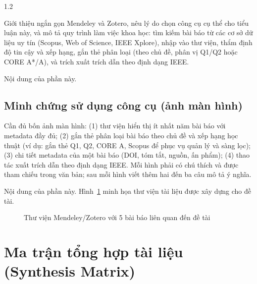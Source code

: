 \begin{spacing}{1.2}
\begin{huongdan}
Giới thiệu ngắn gọn Mendeley và Zotero, nêu lý do chọn công cụ cụ thể cho tiểu luận này, và mô tả quy trình làm việc khoa học: tìm kiếm bài báo từ các cơ sở dữ liệu uy tín (Scopus, Web of Science, IEEE Xplore), nhập vào thư viện, thẩm định độ tin cậy và xếp hạng, gắn thẻ phân loại (theo chủ đề, phân vị Q1/Q2 hoặc CORE A*/A), và trích xuất trích dẫn theo định dạng IEEE.
\end{huongdan}

Nội dung của phần này.

\subsection{Minh chứng sử dụng công cụ (ảnh màn hình)}
\label{subsec:minh_chung_cong_cu}

\begin{huongdan}
Cần đủ bốn ảnh màn hình: (1) thư viện hiển thị ít nhất năm bài báo với metadata đầy đủ; (2) gắn thẻ phân loại bài báo theo chủ đề và xếp hạng học thuật (ví dụ: gắn thẻ Q1, Q2, CORE A, Scopus để phục vụ quản lý và sàng lọc); (3) chi tiết metadata của một bài báo (DOI, tóm tắt, nguồn, ấn phẩm); (4) thao tác xuất trích dẫn theo định dạng IEEE. Mỗi hình phải có chú thích và được tham chiếu trong văn bản; sau mỗi hình viết thêm hai đến ba câu mô tả ý nghĩa.
\end{huongdan}

Nội dung của phần này. Hình~\ref{fig:mendeley} minh họa thư viện tài liệu được xây dựng cho đề tài.

\begin{figure}[htpb]
\centering
{}
\caption{Thư viện Mendeley/Zotero với 5 bài báo liên quan đến đề tài}
\label{fig:mendeley}
\end{figure}

\section{Ma trận tổng hợp tài liệu (Synthesis Matrix)}
\label{sec:synthesis}


\end{spacing}

